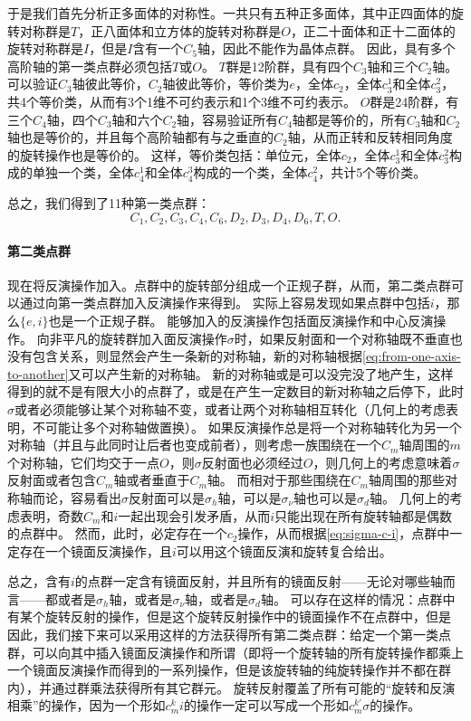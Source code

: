 于是我们首先分析正多面体的对称性。一共只有五种正多面体，其中正四面体的旋转对称群是$T$，正八面体和立方体的旋转对称群是$O$，正二十面体和正十二面体的旋转对称群是$I$，但是$I$含有一个$C_5$轴，因此不能作为晶体点群。
因此，具有多个高阶轴的第一类点群必须包括$T$或$O$。
$T$群是12阶群，具有四个$C_3$轴和三个$C_2$轴。可以验证$C_3$轴彼此等价，$C_2$轴彼此等价，等价类为$e$，全体$c_2$，全体$c_3^1$和全体$c_3^2$，共4个等价类，从而有3个1维不可约表示和1个3维不可约表示。
$O$群是24阶群，有三个$C_4$轴，四个$C_3$轴和六个$C_2$轴，容易验证所有$C_4$轴都是等价的，所有$C_3$轴和$C_2$轴也是等价的，并且每个高阶轴都有与之垂直的$C_2$轴，从而正转和反转相同角度的旋转操作也是等价的。
这样，等价类包括：单位元，全体$c_2$，全体$c_3^1$和全体$c_3^2$构成的单独一个类，全体$c_4^1$和全体$c_4^3$构成的一个类，全体$c_4^2$，共计5个等价类。

总之，我们得到了11种第一类点群：
\[
    C_1, C_2, C_3, C_4, C_6, D_2, D_3, D_4, D_6, T, O.
\]

\paragraph{第二类点群} 现在将反演操作加入。点群中的旋转部分组成一个正规子群，从而，第二类点群可以通过向第一类点群加入反演操作来得到。
实际上容易发现如果点群中包括$i$，那么$\{e, i\}$也是一个正规子群。
能够加入的反演操作包括面反演操作和中心反演操作。
向非平凡的旋转群加入面反演操作$\sigma$时，如果反射面和一个对称轴既不垂直也没有包含关系，则显然会产生一条新的对称轴，新的对称轴根据\eqref{eq:from-one-axis-to-another}又可以产生新的对称轴。
新的对称轴或是可以没完没了地产生，这样得到的就不是有限大小的点群了，或是在产生一定数目的新对称轴之后停下，此时$\sigma$或者必须能够让某个对称轴不变，或者让两个对称轴相互转化（几何上的考虑表明，不可能让多个对称轴做置换）。
如果反演操作总是将一个对称轴转化为另一个对称轴（并且与此同时让后者也变成前者），则考虑一族围绕在一个$C_m$轴周围的$m$个对称轴，它们均交于一点$O$，则$\sigma$反射面也必须经过$O$，则几何上的考虑意味着$\sigma$反射面或者包含$C_m$轴或者垂直于$C_m$轴。
而相对于那些围绕在$C_m$轴周围的那些对称轴而论，容易看出$\sigma$反射面可以是$\sigma_h$轴，可以是$\sigma_\nu$轴也可以是$\sigma_d$轴。
几何上的考虑表明，奇数$C_m$和$i$一起出现会引发矛盾，从而$i$只能出现在所有旋转轴都是偶数的点群中。
然而，此时，必定存在一个$c_2$操作，从而根据\eqref{eq:sigma-c-i}，点群中一定存在一个镜面反演操作，且$i$可以用这个镜面反演和旋转复合给出。

总之，含有$i$的点群一定含有镜面反射，并且所有的镜面反射——无论对哪些轴而言——都或者是$\sigma_h$轴，或者是$\sigma_\nu$轴，或者是$\sigma_d$轴。
可以存在这样的情况：点群中有某个旋转反射的操作，但是这个旋转反射操作中的镜面操作不在点群中，但是
因此，我们接下来可以采用这样的方法获得所有第二类点群：给定一个第一类点群，可以向其中插入镜面反演操作和所谓（即将一个旋转轴的所有旋转操作都乘上一个镜面反演操作而得到的一系列操作，但是该旋转轴的纯旋转操作并不都在群内），并通过群乘法获得所有其它群元。
旋转反射覆盖了所有可能的“旋转和反演相乘”的操作，因为一个形如$c_m^k i$的操作一定可以写成一个形如$c_m^{k'} \sigma$的操作。

